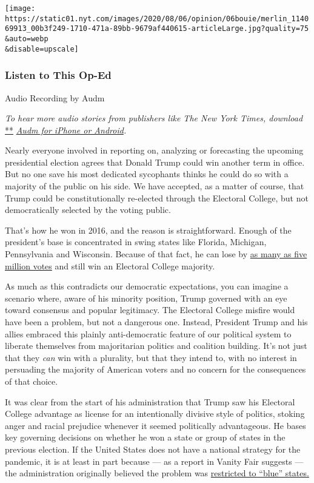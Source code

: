 \texttt{[image: https://static01.nyt.com/images/2020/08/06/opinion/06bouie/merlin\_114069913\_00b3f249-1710-471a-89bb-9679af440615-articleLarge.jpg?quality=75\\\&auto=webp\\\&disable=upscale]}

\hypertarget{listen-to-this-op-ed}{%
\subsubsection{Listen to This Op-Ed}\label{listen-to-this-op-ed}}

Audio Recording by Audm

\emph{To hear more audio stories from publishers like The New York
Times, download}
\href{https://www.audm.com/?utm_source=nytmag\&utm_medium=embed\&utm_campaign=left_behind_draper}{**}
\href{https://www.audm.com/?utm_source=nytopinion\&utm_medium=embed\&utm_campaign=trump_votes_want}{\emph{Audm
for iPhone or Android}}\emph{.}

Nearly everyone involved in reporting on, analyzing or forecasting the
upcoming presidential election agrees that Donald Trump could win
another term in office. But no one save his most dedicated sycophants
thinks he could do so with a majority of the public on his side. We have
accepted, as a matter of course, that Trump could be constitutionally
re-elected through the Electoral College, but not democratically
selected by the voting public.

That's how he won in 2016, and the reason is straightforward. Enough of
the president's base is concentrated in swing states like Florida,
Michigan, Pennsylvania and Wisconsin. Because of that fact, he can lose
by
\href{https://www.nbcnews.com/politics/2020-election/how-trump-could-lose-5-million-votes-still-win-2020-n1031601}{as
many as five million votes} and still win an Electoral College majority.

As much as this contradicts our democratic expectations, you can imagine
a scenario where, aware of his minority position, Trump governed with an
eye toward consensus and popular legitimacy. The Electoral College
misfire would have been a problem, but not a dangerous one. Instead,
President Trump and his allies embraced this plainly anti-democratic
feature of our political system to liberate themselves from majoritarian
politics and coalition building. It's not just that they \emph{can} win
with a plurality, but that they intend to, with no interest in
persuading the majority of American voters and no concern for the
consequences of that choice.

It was clear from the start of his administration that Trump saw his
Electoral College advantage as license for an intentionally divisive
style of politics, stoking anger and racial prejudice whenever it seemed
politically advantageous. He bases key governing decisions on whether he
won a state or group of states in the previous election. If the United
States does not have a national strategy for the pandemic, it is at
least in part because --- as a report in Vanity Fair suggests --- the
administration originally believed the problem was
\href{https://www.vanityfair.com/news/2020/07/how-jared-kushners-secret-testing-plan-went-poof-into-thin-air}{restricted
to ``blue'' states.}

